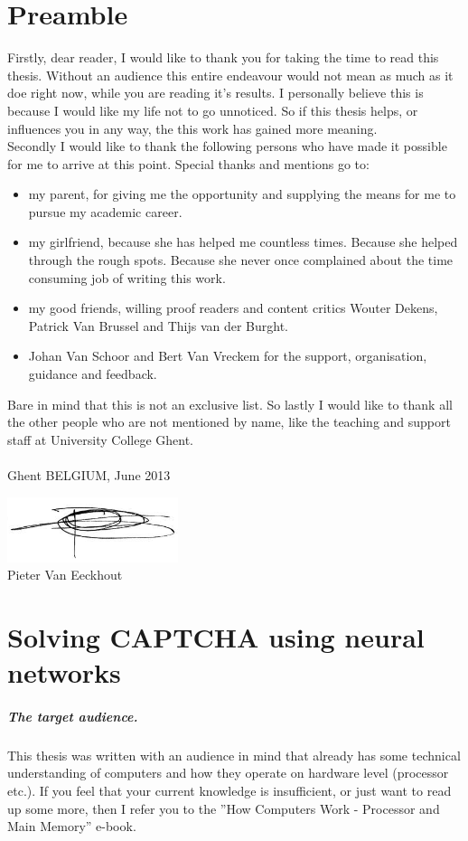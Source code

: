 \documentclass[pdftex,a4paper,12pt,twoside]{report}
\newcommand{\studenta}{Pieter {Van Eeckhout}}
\begin{document}
\chapter*{Preamble}
\label{ch:preamble}
Firstly, dear reader, I would like to thank you for taking the time to read this thesis. Without an audience this entire endeavour would not mean as much as it doe right now, while you are reading it's results. I personally believe this is because I would like my life not to go unnoticed. So if this thesis helps, or influences you in any way, the this work has gained more meaning.\\Secondly I would like to thank the following persons who have made it possible for me to arrive at this point. Special thanks and mentions go to:
\begin{itemize}
\item my parent, for giving me the opportunity and supplying the means for me to pursue my academic career.
\item my girlfriend, because she has helped me countless times. Because she helped through the rough spots. Because she never once complained about the time consuming job of writing this work.
\item my good friends, willing proof readers and content critics Wouter Dekens, Patrick Van Brussel and Thijs van der Burght.
\item Johan Van Schoor and Bert Van Vreckem for the support, organisation, guidance and feedback.
\end{itemize}
Bare in mind that this is not an exclusive list. So lastly I would like to thank all the other people who are not mentioned by name, like the teaching and support staff at University College Ghent.\\\\Ghent BELGIUM, June 2013
\begin{center}
\includegraphics[width=5cm]{./img/signature.png}\\[.5cm]
\studenta
\end{center}
\chapter{Solving CAPTCHA using neural networks}
\label{ch:introduction}
\paragraph{The target audience.}
This thesis was written with an audience in mind that already has some technical understanding of computers and how they operate on hardware level (processor etc.). If you feel that your current knowledge is insufficient, or just want to read up some more, then I refer you to the ''How Computers Work - Processor and Main Memory'' \citep{Young2001} e-book.
\end{document}
